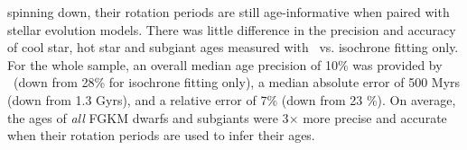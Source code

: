 spinning down, their rotation periods are still age-informative when paired
with stellar evolution models.
There was little difference in the precision and accuracy of cool star, hot
star and subgiant ages measured with \sd\ vs. isochrone
fitting only.
For the whole sample, an overall median age precision of 10\% was provided by
\sd\ (down from 28\% for isochrone fitting only), a median absolute error of
500 Myrs (down from 1.3 Gyrs), and a relative error of 7\% (down from 23 \%).
On average, the ages of {\it all} FGKM dwarfs and subgiants were 3$\times$
more precise and accurate when their rotation periods are used to infer their
ages.

